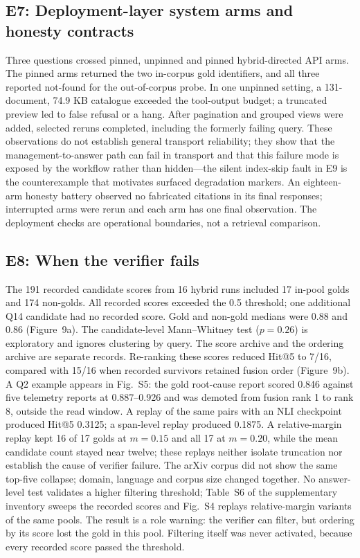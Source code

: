 \documentclass[11pt]{article}
\begin{document}
\subsection{E7: Deployment-layer system arms and honesty contracts}

Three questions crossed pinned, unpinned and pinned hybrid-directed API
arms. The pinned arms returned the two in-corpus gold identifiers, and all
three reported not-found for the out-of-corpus probe. In one unpinned
setting, a 131-document, 74.9 KB catalogue exceeded the tool-output budget;
a truncated preview led to false refusal or a hang. After pagination and
grouped views were added, selected reruns completed, including the formerly
failing query. These observations do not establish general transport
reliability; they show that the management-to-answer path can fail in
transport and that this failure mode is exposed by the workflow rather than
hidden---the silent index-skip fault in E9 is the counterexample that
motivates surfaced degradation markers.
An eighteen-arm honesty battery observed no fabricated citations in its
final responses; interrupted arms were rerun and each arm has one final
observation. The deployment checks are operational boundaries, not a
retrieval comparison.

\subsection{E8: When the verifier fails}


The 191 recorded candidate scores from 16 hybrid runs included 17 in-pool
golds and 174 non-golds. All recorded scores exceeded the 0.5 threshold; one
additional Q14 candidate had no recorded score. Gold and non-gold medians
were 0.88 and 0.86 (Figure~9a). The candidate-level
Mann--Whitney test ($p=0.26$) is exploratory and ignores clustering by
query. The score archive and the ordering archive are separate records.
Re-ranking these scores reduced Hit@5 to 7/16, compared with 15/16 when
recorded survivors retained fusion order (Figure~9b). A Q2
example appears in Fig.~S5: the gold root-cause report scored 0.846 against
five telemetry reports at 0.887--0.926 and was demoted from fusion rank 1 to
rank 8, outside the read window. A replay of the same pairs with an NLI
checkpoint produced Hit@5 0.3125; a span-level replay produced 0.1875. A
relative-margin replay kept 16 of 17 golds at $m=0.15$ and all 17 at
$m=0.20$, while the mean candidate count stayed near twelve; these replays
neither isolate truncation nor establish the cause of verifier failure. The
arXiv corpus did not show the same top-five collapse; domain, language and
corpus size changed together. No answer-level test validates a higher
filtering threshold; Table~S6 of the supplementary inventory sweeps the
recorded scores and Fig.~S4 replays relative-margin variants of the same
pools. The result is a role warning: the verifier can filter, but ordering
by its score lost the gold in this pool. Filtering itself was never
activated, because every recorded score passed the threshold.
\end{document}
